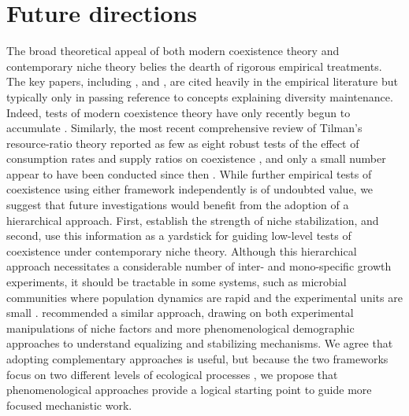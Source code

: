 \section{Future directions}
The broad theoretical appeal of both modern coexistence theory and contemporary niche theory belies the dearth of rigorous empirical treatments. The key papers, including \citet{tilman1982}, \citet{Chase2003} and \citet{Chesson2000}, are cited heavily in the empirical literature but typically only in passing reference to concepts explaining diversity maintenance. Indeed, tests of modern coexistence theory have only recently begun to accumulate \citep[e.g.,][]{Adler2007, Levine2009, Angert2009, Adler2010, Kraft2015, Mordecai2016}. Similarly, the most recent comprehensive review of Tilman's resource-ratio theory reported as few as eight robust tests of the effect of consumption rates and supply ratios on coexistence \citep{miller2005}, and only a small number appear to have been conducted since then \citep[e.g.,][]{Passarge2006}. While further empirical tests of coexistence using either framework independently is of undoubted value, we suggest that future investigations would benefit from the adoption of a hierarchical approach. First, establish the strength of niche stabilization, and second, use this information as a yardstick for guiding low-level tests of coexistence under contemporary niche theory. Although this hierarchical approach necessitates a considerable number of inter- and mono-specific growth experiments, it should be tractable in some systems, such as microbial communities where population dynamics are rapid and the experimental units are small \citep[e.g.,][]{Fox2002, Jiang2007, Violle2011, Vannette2014, Tucker2014}. \citet{Hillerislambers2012} recommended a similar approach, drawing on both experimental manipulations of niche factors and more phenomenological demographic approaches to understand equalizing and stabilizing mechanisms. We agree that adopting complementary approaches is useful, but because the two frameworks focus on two different levels of ecological processes \citep[\textit{sensu}][]{Vellend2016}, we propose that phenomenological approaches provide a logical starting point to guide more focused mechanistic work. 
\par


